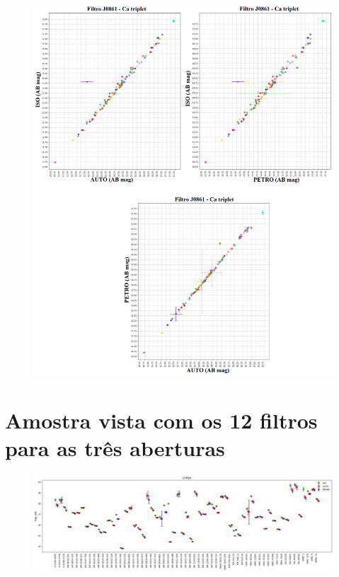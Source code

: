 \begin{anexosenv}
    \begin{figure}[h]
        \centering
        \includegraphics[width=1.0\textwidth]{Imagens/J0861_iso_auto.png}
        \caption[]{}
        \label{fig:J0861_iso_auto} 
    \end{figure}

\clearpage

\section{Amostra vista com os 12 filtros para as três aberturas} \label{sec:amostra_aberturas_12filtros}

    \begin{figure}[h]
        \centering
        \includegraphics[width=1.0\textwidth]{Imagens/galaxias_horizontal_u.png}
        \caption[]{}
        \label{fig:galaxias_horizontal_u} 
    \end{figure}


\end{anexosenv}
